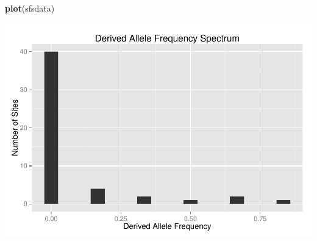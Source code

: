 \documentclass[]{article}
\newenvironment{Shaded}{\begin{snugshade}}{\end{snugshade}}
\newcommand{\KeywordTok}[1]{\textcolor[rgb]{0.13,0.29,0.53}{\textbf{{#1}}}}
\newcommand{\NormalTok}[1]{{#1}}
\begin{document}
\begin{Shaded}
\begin{Highlighting}[]
\KeywordTok{plot}\NormalTok{(sfsdata)}
\end{Highlighting}
\end{Shaded}

\includegraphics{munjal-201d-ps1_files/figure-latex/unnamed-chunk-28-1.pdf}
\end{document}
